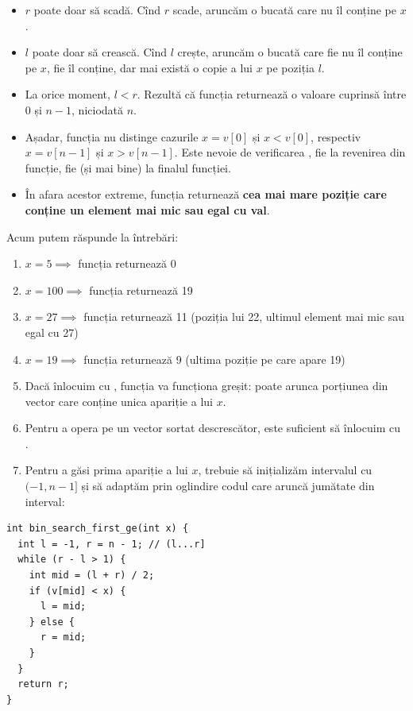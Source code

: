 \documentclass[../main.tex]{subfiles}
\begin{document}
\begin{itemize}
  \item $r$ poate doar să scadă. Cînd $r$ scade, aruncăm o bucată care nu îl conține pe $x$.

  \item $l$ poate doar să crească. Cînd $l$ crește, aruncăm o bucată care fie nu îl conține pe $x$, fie îl conține, dar mai există o copie a lui $x$ pe poziția $l$.

  \item La orice moment, $l < r$. Rezultă că funcția returnează o valoare cuprinsă între 0 și $n-1$, niciodată $n$.

  \item Așadar, funcția nu distinge cazurile $x = v[0]$ și $x < v[0]$, respectiv $x = v[n-1]$ și $x > v[n-1]$. Este nevoie de verificarea , fie la revenirea din funcție, fie (și mai bine) la finalul funcției.

  \item În afara acestor extreme, funcția returnează \textbf{cea mai mare poziție care conține un element mai mic sau egal cu val}.
\end{itemize}

Acum putem răspunde la întrebări:

\begin{enumerate}
  \item $x = 5 \implies$ funcția returnează 0
  \item $x = 100 \implies$ funcția returnează 19
  \item $x = 27 \implies$ funcția returnează 11 (poziția lui 22, ultimul element mai mic sau egal cu 27)
  \item $x = 19 \implies$ funcția returnează 9 (ultima poziție pe care apare 19)

  \item Dacă înlocuim \ccode{>} cu \ccode{>=}, funcția va funcționa greșit: poate arunca porțiunea din vector care conține unica apariție a lui $x$.

  \item Pentru a opera pe un vector sortat descrescător, este suficient să înlocuim \ccode{>} cu \ccode{<}.

  \item Pentru a găsi prima apariție a lui $x$, trebuie să inițializăm intervalul cu $(-1, n-1]$ și să adaptăm prin oglindire codul care aruncă jumătate din interval:
\end{enumerate}

\begin{verbatim}
int bin_search_first_ge(int x) {
  int l = -1, r = n - 1; // (l...r]
  while (r - l > 1) {
    int mid = (l + r) / 2;
    if (v[mid] < x) {
      l = mid;
    } else {
      r = mid;
    }
  }
  return r;
}
\end{verbatim}
\end{document}
